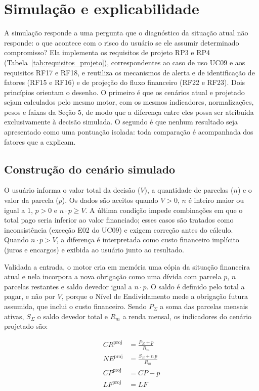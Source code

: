 \documentclass[portuguese]{sbc2025}%
\begin{document}
\section{Simulação e explicabilidade}
\label{sec:simulacao}

A simulação responde a uma pergunta que o diagnóstico da situação atual não responde: o que acontece com o risco do usuário se ele assumir determinado compromisso? Ela implementa os requisitos de projeto RP3 e RP4 (Tabela~\ref{tab:requisitos_projeto}), correspondentes ao caso de uso UC09 e aos requisitos RF17 e RF18, e reutiliza os mecanismos de alerta e de identificação de fatores (RF15 e RF16) e de projeção do fluxo financeiro (RF22 e RF23). Dois princípios orientam o desenho. O primeiro é que os cenários atual e projetado sejam calculados pelo mesmo motor, com os mesmos indicadores, normalizações, pesos e faixas da Seção 5, de modo que a diferença entre eles possa ser atribuída exclusivamente à decisão simulada. O segundo é que nenhum resultado seja apresentado como uma pontuação isolada: toda comparação é acompanhada dos fatores que a explicam.

\subsection{Construção do cenário simulado}

O usuário informa o valor total da decisão ($V$), a quantidade de parcelas ($n$) e o valor da parcela ($p$). Os dados são aceitos quando $V > 0$, $n$ é inteiro maior ou igual a 1, $p > 0$ e $n \cdot p \ge V$. A última condição impede combinações em que o total pago seria inferior ao valor financiado; esses casos são tratados como inconsistência (exceção E02 do UC09) e exigem correção antes do cálculo. Quando $n \cdot p > V$, a diferença é interpretada como custo financeiro implícito (juros e encargos) e exibida ao usuário junto ao resultado.

Validada a entrada, o motor cria em memória uma cópia da situação financeira atual e nela incorpora a nova obrigação como uma dívida com parcela $p$, $n$ parcelas restantes e saldo devedor igual a $n \cdot p$. O saldo é definido pelo total a pagar, e não por $V$, porque o Nível de Endividamento mede a obrigação futura assumida, que inclui o custo financeiro. Sendo $P_\Sigma$ a soma das parcelas mensais ativas, $S_\Sigma$ o saldo devedor total e $R_m$ a renda mensal, os indicadores do cenário projetado são:

\begin{align}
CR^{\mathrm{proj}} &= \frac{P_\Sigma + p}{R_m} \label{eq:sim-cr}\\
NE^{\mathrm{proj}} &= \frac{S_\Sigma + n\,p}{R_m} \label{eq:sim-ne}\\
CP^{\mathrm{proj}} &= CP - p \label{eq:sim-cp}\\
LF^{\mathrm{proj}} &= LF \label{eq:sim-lf}
\end{align}
\end{document}
